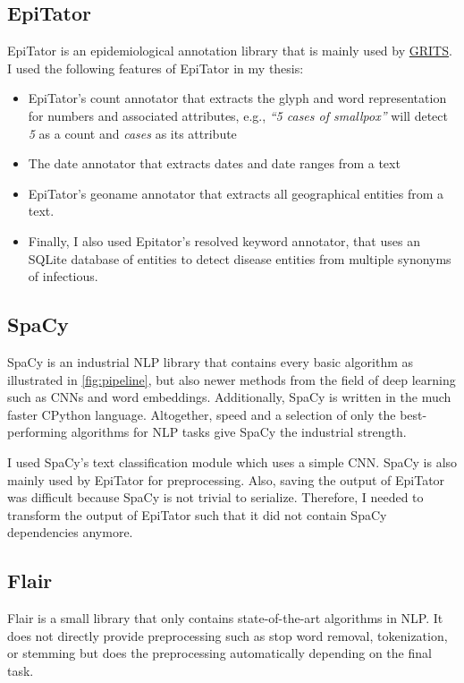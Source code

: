 \subsection{EpiTator}
  EpiTator is an epidemiological annotation library that is mainly used by \href{https://grits.eha.io}{GRITS}.
  I used the following features of EpiTator in my thesis:
  \begin{itemize}
    \item EpiTator's count annotator that extracts the glyph and word representation for numbers and associated attributes, e.g., \textit{``5 cases of smallpox''} will detect \textit{5} as a count and \textit{cases} as its attribute
    \item The date annotator that extracts dates and date ranges from a text
    \item EpiTator's geoname annotator that extracts all geographical entities from a text.
    \item Finally, I also used Epitator's resolved keyword annotator, that uses an SQLite database of entities to detect disease entities from multiple synonyms of infectious.
  \end{itemize}

\subsection{SpaCy}
  SpaCy is an industrial NLP library that contains every basic algorithm as illustrated in \ref{fig:pipeline}, but also newer methods from the field of deep learning such as CNNs and word embeddings.
  Additionally, SpaCy is written in the much faster CPython language.
  Altogether, speed and a selection of only the best-performing algorithms for NLP tasks give SpaCy the industrial strength.

  I used SpaCy's text classification module which uses a simple CNN.
  SpaCy is also mainly used by EpiTator for preprocessing.
  Also, saving the output of EpiTator was difficult because SpaCy is not trivial to serialize.
  Therefore, I needed to transform the output of EpiTator such that it did not contain SpaCy dependencies anymore.

\subsection{Flair}
  Flair is a small library that only contains state-of-the-art algorithms in NLP.
  It does not directly provide preprocessing such as stop word removal, tokenization, or stemming but does the preprocessing automatically depending on the final task.

